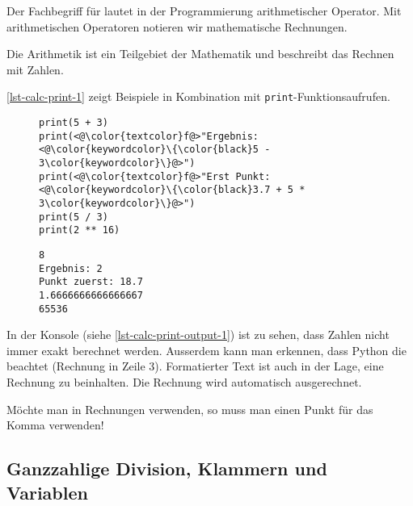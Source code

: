 \begin{definition}
Der Fachbegriff für  lautet in der Programmierung arithmetischer Operator. Mit arithmetischen Operatoren notieren wir mathematische Rechnungen.
\end{definition}

Die Arithmetik ist ein Teilgebiet der Mathematik und beschreibt das Rechnen mit Zahlen.

\begin{example}
\autoref{lst-calc-print-1} zeigt Beispiele in Kombination mit \lstinline{print}-Funktionsaufrufen.

\begin{figure}[htb]
\centering
\begin{minipage}{0.6\textwidth}
\centering
\begin{lstlisting}[label={lst-calc-print-1}, caption={Rechenbeispiele}]
print(5 + 3)
print(<@\color{textcolor}f@>"Ergebnis: <@\color{keywordcolor}\{\color{black}5 - 3\color{keywordcolor}\}@>")
print(<@\color{textcolor}f@>"Erst Punkt: <@\color{keywordcolor}\{\color{black}3.7 + 5 * 3\color{keywordcolor}\}@>")
print(5 / 3)
print(2 ** 16)
\end{lstlisting}
\end{minipage}
\hfill
\begin{minipage}{0.35\textwidth}
\centering
\begin{lstlisting}[language=output, caption={Konsolenausgabe}, label={lst-calc-print-output-1}]
8
Ergebnis: 2
Punkt zuerst: 18.7
1.6666666666666667
65536
\end{lstlisting}
\end{minipage}
\end{figure}

In der Konsole (siehe \autoref{lst-calc-print-output-1}) ist zu sehen, dass Zahlen nicht immer exakt berechnet werden. Ausserdem kann man erkennen, dass Python die  beachtet (Rechnung in Zeile \num{3}). Formatierter Text ist auch in der Lage, eine Rechnung zu beinhalten. Die Rechnung wird automatisch ausgerechnet.

\end{example}

\begin{important}
Möchte man  in Rechnungen verwenden, so muss man einen Punkt für das Komma verwenden!
\end{important}

\subsection{Ganzzahlige Division, Klammern und Variablen}

